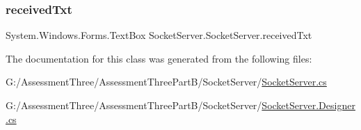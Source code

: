 \mbox{\label{class_socket_server_1_1_socket_server_aea45323bf62d2f24f8992a0380fd1044}} 
\subsubsection{\texorpdfstring{received\+Txt}{receivedTxt}}
{\footnotesize\ttfamily System.\+Windows.\+Forms.\+Text\+Box Socket\+Server.\+Socket\+Server.\+received\+Txt\hspace{0.3cm}{\ttfamily [private]}}



The documentation for this class was generated from the following files\+:\begin{DoxyCompactItemize}
\item 
G\+:/\+Assessment\+Three/\+Assessment\+Three\+Part\+B/\+Socket\+Server/\hyperlink{_socket_server_8cs}{Socket\+Server.\+cs}\item 
G\+:/\+Assessment\+Three/\+Assessment\+Three\+Part\+B/\+Socket\+Server/\hyperlink{_socket_server_8_designer_8cs}{Socket\+Server.\+Designer.\+cs}\end{DoxyCompactItemize}
